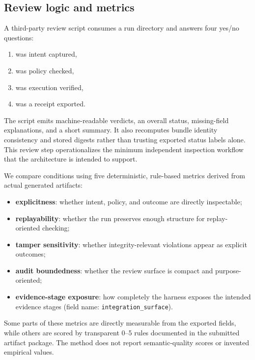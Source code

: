 \subsection{Review logic and metrics}

A third-party review script consumes a run directory and answers four yes/no questions:

\begin{enumerate}[leftmargin=1.8em]
  \item was intent captured,
  \item was policy checked,
  \item was execution verified,
  \item was a receipt exported.
\end{enumerate}

The script emits machine-readable verdicts, an overall status, missing-field explanations, and a short summary. It also recomputes bundle identity consistency and stored digests rather than trusting exported status labels alone. This review step operationalizes the minimum independent inspection workflow that the architecture is intended to support.

We compare conditions using five deterministic, rule-based metrics derived from actual generated artifacts:

\begin{itemize}
  \item \textbf{explicitness}: whether intent, policy, and outcome are directly inspectable;
  \item \textbf{replayability}: whether the run preserves enough structure for replay-oriented checking;
  \item \textbf{tamper sensitivity}: whether integrity-relevant violations appear as explicit outcomes;
  \item \textbf{audit boundedness}: whether the review surface is compact and purpose-oriented;
  \item \textbf{evidence-stage exposure}: how completely the harness exposes the intended evidence stages (field name: \texttt{integration\_surface}).
\end{itemize}

Some parts of these metrics are directly measurable from the exported fields, while others are scored by transparent 0--5 rules documented in the submitted artifact package. The method does not report semantic-quality scores or invented empirical values.
